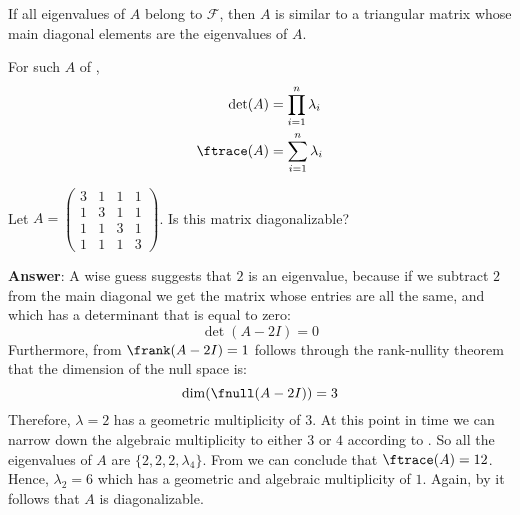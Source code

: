 \begin{thm}\label{thm-similar-to-triangular}
	If all eigenvalues of $A$ belong to $\mathcal{F}$, then $A$ is similar to a
	triangular matrix whose main diagonal elements are the eigenvalues of $A$.
\end{thm}

\begin{crl}\label{crl-similar-to-triangular}
	For such $A$ of ,
	\begin{align}
		\det(A)    & =\prod_{i=1}^n\lambda_i\label{eq-similar-to-triangular:1} \\
		\ftrace(A) & =\sum_{i=1}^n\lambda_i\label{eq-similar-to-triangular:2}
	\end{align}
\end{crl}

\begin{exm}
	Let $A=
		\left(
		\begin{smallmatrix}
			3 & 1 & 1 & 1 \\
			1 & 3 & 1 & 1 \\
			1 & 1 & 3 & 1 \\
			1 & 1 & 1 & 3
		\end{smallmatrix}
		\right)$. Is this matrix diagonalizable?
	\begin{flushleft}
		\textbf{Answer}: A wise guess suggests that $2$ is an eigenvalue, because
		if we subtract $2$ from the main diagonal we get the matrix whose entries
		are all the same, and which has a determinant that is equal to zero:
		\begin{equation*}
			\det(A-2I)=0
		\end{equation*}
		Furthermore, from $\frank(A-2I)=1$ follows through the rank-nullity theorem
		that the dimension of the null space is:
		\begin{equation*}
			\dim(\fnull(A-2I))=3
		\end{equation*}
		Therefore, $\lambda=2$ has a geometric multiplicity of $3$. At this point
		in time we can narrow down the algebraic multiplicity to either $3$ or $4$
		according to . So all the
		eigenvalues of $A$ are $\{2,2,2,\lambda_4\}$. From 
		we can conclude that $\ftrace(A)=12$. Hence, $\lambda_2=6$ which has a geometric
		and algebraic multiplicity of $1$. Again, by 
		it follows that $A$ is diagonalizable.
	\end{flushleft}
\end{exm}

